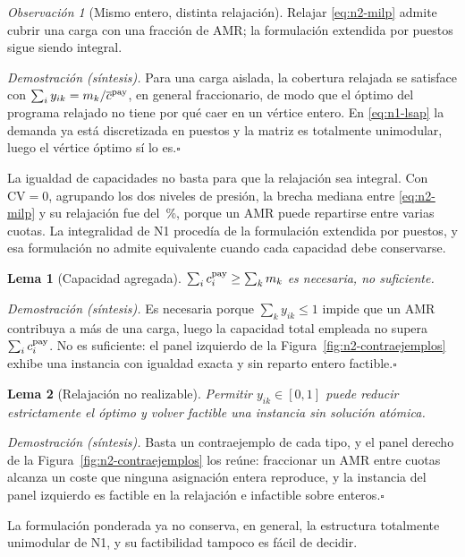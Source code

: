 \documentclass[12pt,a4paper]{article}
\newtheorem{n1lema}{Lema}
\theoremstyle{remark}
\newtheorem{n1obs}{Observación}
\theoremstyle{plain}
\newcommand{\proofsketch}[1]{%
  {\small\textit{Demostración (síntesis).} #1\hfill$\square$\par}
}
\begin{document}
\begin{n1obs}[Mismo entero, distinta relajación]
Relajar \eqref{eq:n2-milp} admite cubrir una carga con una fracción de AMR; la
formulación extendida por puestos sigue siendo integral.
\end{n1obs}
\proofsketch{Para una carga aislada, la cobertura relajada se satisface con
$\sum_iy_{ik}=m_k/\overline{c}^{\rm pay}$, en general fraccionario, de modo que
el óptimo del programa relajado no tiene por qué caer en un vértice entero. En
\eqref{eq:n1-lsap} la demanda ya está discretizada en puestos y la matriz es
totalmente unimodular, luego el vértice óptimo sí lo es.}
La igualdad de capacidades no basta para que la relajación sea integral. Con
$\mathrm{CV}=0$, agrupando los dos niveles de presión, la brecha mediana entre
\eqref{eq:n2-milp} y su relajación fue del \NTwoGapHomogeneousPct\,\%, porque un
AMR puede repartirse entre varias cuotas. La
integralidad de N1 procedía de la formulación extendida por puestos, y esa
formulación no admite equivalente cuando cada capacidad debe conservarse.

\begin{n1lema}[Capacidad agregada]
$\sum_i c_i^{\rm pay}\ge\sum_km_k$ es necesaria, no suficiente.
\end{n1lema}
\proofsketch{Es necesaria porque $\sum_ky_{ik}\le1$ impide que un AMR contribuya a
más de una carga, luego la capacidad total empleada no supera $\sum_ic_i^{\rm
pay}$. No es suficiente: el panel izquierdo de la
Figura~\ref{fig:n2-contraejemplos} exhibe una instancia con igualdad exacta y sin
reparto entero factible.}

\begin{n1lema}[Relajación no realizable]
Permitir $y_{ik}\in[0,1]$ puede reducir estrictamente el óptimo y volver factible
una instancia sin solución atómica.
\end{n1lema}
\proofsketch{Basta un contraejemplo de cada tipo, y el panel derecho de la
Figura~\ref{fig:n2-contraejemplos} los reúne: fraccionar un AMR entre cuotas
alcanza un coste que ninguna asignación entera reproduce, y la instancia del panel
izquierdo es factible en la relajación e infactible sobre enteros.}

La formulación ponderada ya no conserva, en general, la estructura totalmente
unimodular de N1, y su factibilidad tampoco es fácil de decidir.
\end{document}
